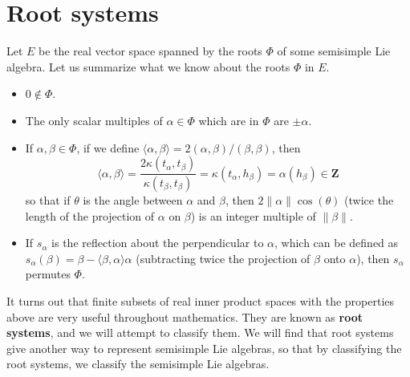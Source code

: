 \chapter{Root systems}

Let $E$ be the real vector space spanned by the roots $\Phi$ of some semisimple Lie algebra. Let us summarize what we know about the roots $\Phi$ in $E$.
%
\begin{itemize}
    \item $0 \not \in \Phi$.
    \item The only scalar multiples of $\alpha \in \Phi$ which are in $\Phi$ are $\pm \alpha$.
    \item If $\alpha, \beta \in \Phi$, if we define $\langle \alpha, \beta \rangle = 2 (\alpha, \beta) / (\beta, \beta)$, then
    \[ \langle \alpha, \beta \rangle = \frac{2 \kappa(t_\alpha, t_\beta)}{\kappa(t_\beta, t_\beta)} = \kappa(t_\alpha, h_\beta) = \alpha(h_\beta) \in \mathbf{Z} \]
    so that if $\theta$ is the angle between $\alpha$ and $\beta$, then $2 \| \alpha \| \cos(\theta)$ (twice the length of the projection of $\alpha$ on $\beta$) is an integer multiple of $\| \beta \|$.
    \item If $s_\alpha$ is the reflection about the perpendicular to $\alpha$, which can be defined as $s_\alpha(\beta) = \beta - \langle \beta, \alpha \rangle \alpha$ (subtracting twice the projection of $\beta$ onto $\alpha$), then $s_\alpha$ permutes $\Phi$.
\end{itemize}
%
It turns out that finite subsets of real inner product spaces with the properties above are very useful throughout mathematics. They are known as {\bf root systems}, and we will attempt to classify them. We will find that root systems give another way to represent semisimple Lie algebras, so that by classifying the root systems, we classify the semisimple Lie algebras.


